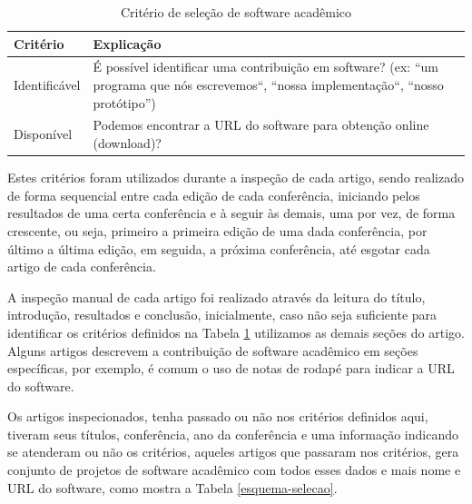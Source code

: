 \begin{table}[h]
\caption{Critério de seleção de software acadêmico}
\centering
\begin{tabular}{ l p{12cm} }
  \hline
  Critério         & Explicação \\
  \hline
  Identificável    & É possível identificar uma contribuição em software? (ex: ``um programa que nós escrevemos``, ``nossa implementação``, ``nosso protótipo'') \\
  Disponível       & Podemos encontrar a URL do software para obtenção online (download)? \\
  \hline
\end{tabular}
\label{criterios-selecao}
\end{table}

Estes critérios foram utilizados durante a inspeção de cada artigo, sendo
realizado de forma sequencial entre cada edição de cada conferência, iniciando
pelos resultados de uma certa conferência e à seguir às demais, uma por vez, de
forma crescente, ou seja, primeiro a primeira edição de uma dada conferência,
por último a última edição, em seguida, a próxima conferência, até esgotar cada
artigo de cada conferência.


A inspeção manual de cada artigo foi realizado através da leitura do título,
introdução, resultados e conclusão, inicialmente, caso não seja suficiente para
identificar os critérios definidos na Tabela \ref{criterios-selecao} utilizamos
as demais seções do artigo. Alguns artigos descrevem a contribuição de software
acadêmico em seções específicas, por exemplo, é comum o uso de notas de rodapé
para indicar a URL do software.


Os artigos inspecionados, tenha passado ou não nos critérios definidos aqui,
tiveram seus títulos, conferência, ano da conferência e uma informação
indicando se atenderam ou não os critérios, aqueles artigos que passaram nos
critérios, gera conjunto de projetos de software acadêmico com todos esses
dados e mais nome e URL do software, como mostra a Tabela \ref{esquema-selecao}.

